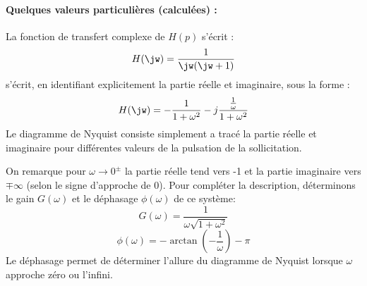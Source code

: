 \paragraph{Quelques valeurs particulières (calculées) :}
\begin{center}
\end{center}
\clearpage
La fonction de transfert complexe de $H(p)$ s'écrit :
\[
    H(\jw)=\dfrac{1}{\jw(\jw+1)}
\]
s'écrit, en identifiant explicitement la partie réelle et imaginaire, sous la 
forme :
\[
    H(\jw)=-\dfrac{1}{1+\omega^2}-j\dfrac{\frac{1}{\omega}}{1+\omega^2}
\]
Le diagramme de Nyquist consiste simplement a tracé la partie réelle et 
imaginaire pour différentes valeurs de la pulsation de la sollicitation.
\begin{figure}[!t]
    \centering
    
\end{figure}
On remarque pour $\omega\rightarrow0^\pm$ la partie réelle tend vers -1 et la 
partie imaginaire vers $\mp\infty$ (selon le signe d'approche de 0).
Pour compléter la description, déterminons le gain $G(\omega)$ et le déphasage 
$\phi(\omega)$ de ce système:
\[
    G(\omega)=\dfrac{1}{\omega\sqrt{1+\omega^2}}
\]
\[
    \phi(\omega)=-\arctan{\left(-\dfrac{1}{\omega}\right)}-\pi
\]
Le déphasage permet de déterminer l'allure du diagramme de Nyquist 
lorsque $\omega$ approche zéro ou l'infini. 
